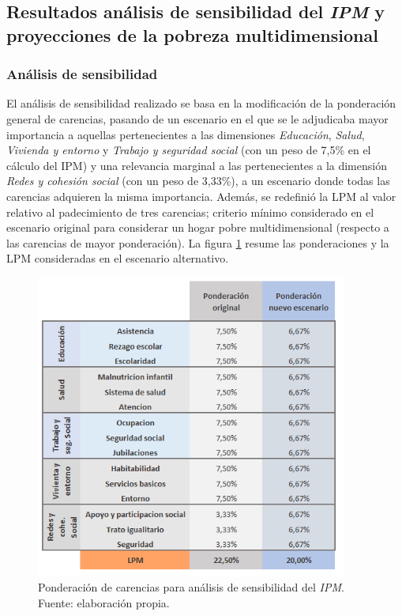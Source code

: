 \documentclass[12pt,letterpaper,spanish]{article}
\begin{document}
\subsection{Resultados análisis de sensibilidad del \textit{IPM} y proyecciones de la pobreza multidimensional}


\subsubsection{Análisis de sensibilidad}

El análisis de sensibilidad realizado se basa en la modificación de la ponderación general de carencias, pasando de un escenario en el que se le adjudicaba mayor importancia a aquellas pertenecientes a las dimensiones \textit{Educación}, \textit{Salud}, \textit{Vivienda y entorno} y \textit{Trabajo y seguridad social} (con un peso de 7,5\% en el cálculo del IPM) y una relevancia marginal a las pertenecientes a la dimensión \textit{Redes y cohesión social} (con un peso de 3,33\%), a un escenario donde todas las carencias adquieren la misma importancia. Además, se redefinió la LPM al valor relativo al padecimiento de tres carencias; criterio mínimo considerado en el escenario original para considerar un hogar pobre multidimensional (respecto a las carencias de mayor ponderación). La figura \ref{ponddosdos} resume las ponderaciones y la LPM consideradas en el escenario alternativo. 

\begin{figure}[H]
    \centering
    \includegraphics[height=10cm]{Max/ponderaciones_sensib.png}
    \caption{Ponderación de carencias para análisis de sensibilidad del \textit{IPM}. Fuente: elaboración propia.}
    \label{ponddosdos}
\end{figure}
\end{document}

